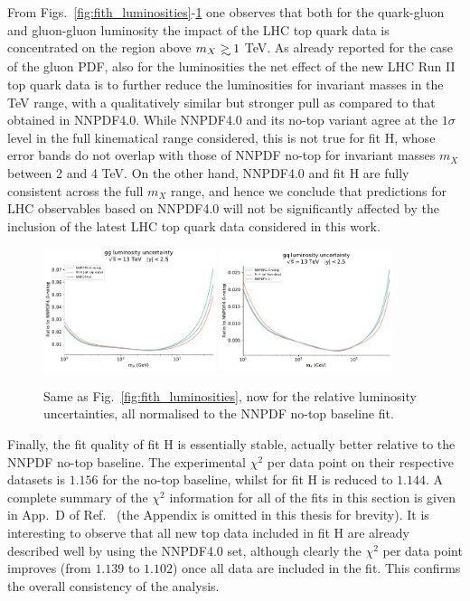\documentclass[withindex,glossary]{cam-thesis}
\def\gsim{\mathrel{\rlap{\lower4pt\hbox{\hskip1pt$\sim$}}
    \raise1pt\hbox{$>$}}}
\begin{document}
From Figs.~\ref{fig:fith_luminosities}-\ref{fig:fith_luminosities_unc} one
observes that both
for the quark-gluon and gluon-gluon luminosity the impact
of the LHC top quark data is concentrated on the region above $m_X \gsim 1$ TeV.
%
As already reported for the case of the gluon PDF, also for the luminosities
the net effect of the new LHC Run II top quark data is to further reduce
the luminosities for invariant masses in the TeV range, with a qualitatively
similar but stronger pull as compared to that obtained in NNPDF4.0.
%
While NNPDF4.0 and its no-top variant agree at the $1\sigma$ level in the full
kinematical range considered, this is not true for fit H,  whose error bands
do not overlap with those of NNPDF no-top for invariant masses $m_X$ between
2 and 4 TeV.
%
On the other hand, NNPDF4.0 and fit H are fully consistent across the full
$m_X$ range, and hence we conclude that predictions for LHC observables
based on NNPDF4.0 will not be significantly affected by the inclusion
of the latest LHC top quark data considered in this work.

\begin{figure}[t]
\centering
\includegraphics[width=0.45\textwidth]{pdf_plots/fitH_gg_lumi_unc.pdf}
\includegraphics[width=0.45\textwidth]{pdf_plots/fitH_gq_lumi_unc.pdf}
\caption{Same as Fig.~\ref{fig:fith_luminosities}, now for the
  relative luminosity uncertainties, all normalised to the
  NNPDF no-top baseline fit.
}
\label{fig:fith_luminosities_unc}
\end{figure}

Finally, the fit quality of fit H is essentially stable, actually 
better relative to the NNPDF no-top baseline. The experimental $\chi^2$ per data point on
their respective datasets is $1.156$ for the no-top baseline, whilst for
fit H is reduced to $1.144$. A complete summary of the $\chi^2$ information
for all of the fits in this section is given in App.~D of Ref.~\cite{Kassabov:2023hbm} (the Appendix
is omitted in this thesis for brevity).
It is interesting to observe that all new top data included in fit H are
already described well by using the NNPDF4.0 set, although clearly the $\chi^2$
per data point improves (from $1.139$ to $1.102$) once all data are included
in the fit. This confirms the overall consistency of the analysis. 
\end{document}
